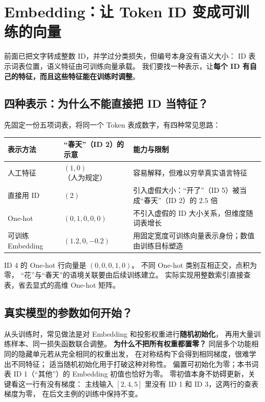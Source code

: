 \chapterrule
\section{Embedding：让 Token ID 变成可训练的向量}
\label{intro:20-embeddings}
\label{concept:embedding}

前面已把文字转成整数 ID，并学过分类损失，但编号本身没有语义大小：
ID 表示词表位置，语义特征由可训练向量承载。
我们要找一种表示，让\textbf{每个 ID 有自己的特征，而且这些特征能在训练时调整}。

\subsection{四种表示：为什么不能直接把 ID 当特征？}
\label{partq:tokens}

先固定一份五项词表，将同一个 Token 表成数字，有四种常见思路：
\begin{center}\small
{}
\begin{tabularx}{\linewidth}{@{}p{25mm}p{34mm}X@{}}
\toprule
表示方法 & “春天”（ID 2）的示意 & 能力与限制\\\midrule
人工特征 & $(1,0)$（人为规定） & 容易解释，但难以穷举真实语言特征\\
直接用 ID & $(2)$ & 引入虚假大小：“开了”（ID 5）被当成“春天”（ID 2）的 $2.5$ 倍\\
One-hot & $(0,1,0,0,0)$ & 不引入虚假的 ID 大小关系，但维度随词表增长\\
可训练 Embedding & $(1.2,0,-0.2)$ & 用固定宽度可训练向量表示身份；数值由训练目标塑造\\
\bottomrule
\end{tabularx}
\end{center}
ID 4 的 One-hot 行向量是 $(0,0,0,1,0)$。
不同 One-hot 类别互相正交，点积为零，
“花”与“春天”的语境关联要由后续训练建立。
实际实现用整数索引直接查表，省去显式的高维 One-hot 矩阵。

\subsection{真实模型的参数如何开始？}
\label{concept:embedding-initialization}

从头训练时，常见做法是对 Embedding 和投影权重进行\textbf{随机初始化}，
再用大量训练样本、同一损失函数联合调整。
\textbf{为什么不把所有权重都置零？}
同层多个功能相同的隐藏单元若从完全相同的权重出发，
在对称结构下会得到相同梯度，很难学出不同特征；
适当随机初始化用于打破这种对称性。
偏置可初始化为零；本书词表 ID 1（“其他”）的 Embedding 初值也恰好为零。
零初值本身不妨碍更新，关键看这一行有没有梯度：
主线输入 $[2,4,5]$ 里没有 ID 1 和 ID 3，这两行的查表梯度为零，
在后文主例的训练中保持不变。

